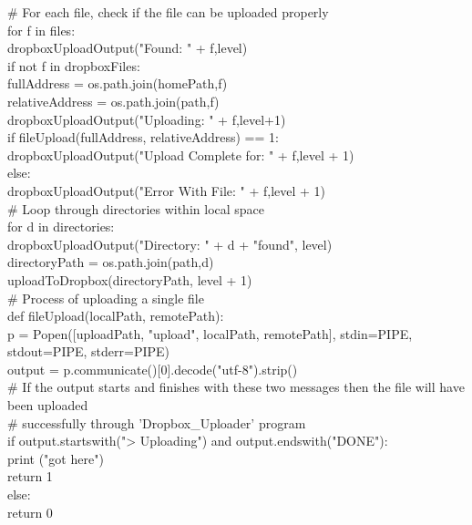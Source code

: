 \documentclass[a4paper,11pt]{report}
\begin{document}
        \# For each file, check if the file can be uploaded properly\\
        for f in files:                                 \\
            dropboxUploadOutput("Found: " + f,level)   \\
            if not f in dropboxFiles:\\
                fullAddress = os.path.join(homePath,f)\\
                relativeAddress = os.path.join(path,f)  \\
                dropboxUploadOutput("Uploading: " + f,level+1)   \\
                if fileUpload(fullAddress, relativeAddress) == 1:\\
                    dropboxUploadOutput("Upload Complete for: " + f,level + 1)                                  \\          
                else:\\
                    dropboxUploadOutput("Error With File: " + f,level + 1)\\
                    
        \# Loop through directories within local space       \\
        for d in directories:\\
            dropboxUploadOutput("Directory: " + d + "found", level)\\
            directoryPath = os.path.join(path,d)\\
            uploadToDropbox(directoryPath, level + 1)\\

\# Process of uploading a single file \\
def fileUpload(localPath, remotePath):\\
    p = Popen([uploadPath, "upload", localPath, remotePath], stdin=PIPE, stdout=PIPE, stderr=PIPE)\\
    output = p.communicate()[0].decode("utf-8").strip()\\
    \# If the output starts and finishes with these two messages then the file will have been uploaded\\
    \# successfully through 'Dropbox\_Uploader' program\\
    if output.startswith("> Uploading") and output.endswith("DONE"):\\
        print ("got here")\\
        return 1\\
    else:\\
        return 0\\
\end{document}
